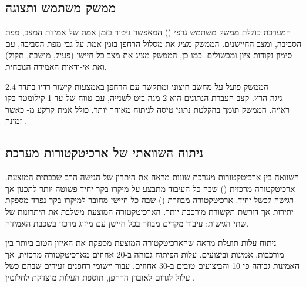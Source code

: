 \subsection{ממשק משתמש ותצוגה}
\label{sec:ch07_user_interface}

המערכת כוללת ממשק משתמש גרפי () המאפשר ניטור בזמן אמת של אמידת המצב, מפת הסביבה, ומצב החיישנים. הממשק מציג את מסלול הרחפן בזמן אמת על גבי מפת הסביבה, עם סימון נקודות ציון ומכשולים. כמו כן, הממשק מציג את מצב כל חיישן (פעיל, מושבת, תקול) ואת אי-ודאות האמידה הנוכחית.

הממשק פועל על מחשב חיצוני ומתקשר עם הרחפן באמצעות קישור רדיו  בתדר 2.4 גיגה-הרץ. קצב העברת הנתונים הוא 2 מגה-ביט לשנייה, עם טווח של עד 1 קילומטר בקו ראייה. הממשק תומך בהקלטת נתוני טיסה לניתוח מאוחר יותר, כולל אמת קרקע מ- כאשר זמינה \cite{Chen2020BioSonar, Thrun2005ProbRobotics}.

\subsection{ניתוח השוואתי של ארכיטקטורות מערכת}
\label{sec:ch07_architectural_comparison}

השוואה בין ארכיטקטורות מערכת שונות מראה את היתרון של הגישה הרב-שכבתית המוצעת. ארכיטקטורה מרכזית () שבה כל העיבוד מתבצע על מיקרו-בקר יחיד פשוטה יותר לתכנון אך רגישה לכשל יחיד. ארכיטקטורה מבוזרת () שבה כל חיישן מחובר למיקרו-בקר נפרד מספקת יתירות אך דורשת תקשורת מורכבת יותר. הארכיטקטורה המוצעת משלבת את היתרונות של שתי הגישות: עיבוד מקדים מבוזר בכל חיישן עם מיזוג מרכזי בשכבת האמידה.

ניתוח עלות-תועלת מראה שהארכיטקטורה המוצעת מספקת את האיזון הטוב ביותר בין מורכבות, אמינות וביצועים. עלות הפיתוח גבוהה ב-20 אחוזים מארכיטקטורה מרכזית, אך האמינות גבוהה פי 10 והביצועים טובים ב-30 אחוזים. עבור יישומי רחפנים זעירים שבהם כשל עלול לגרום לאובדן הרחפן, תוספת העלות מוצדקת לחלוטין \cite{Chen2020BioSonar, Horiuchi2005Neuromorphic, CrewAIDocs, Thrun2005ProbRobotics}.